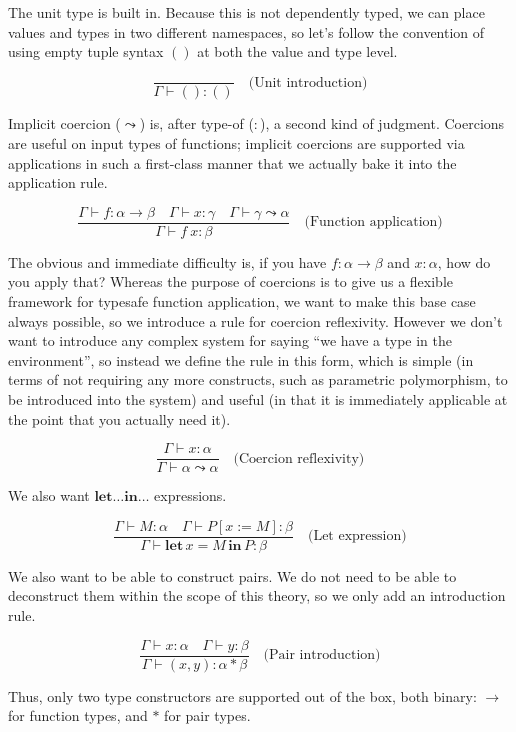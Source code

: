 \documentclass{article}
\begin{document}
The unit type is built in. Because this is not dependently typed, we can place
values and types in two different namespaces, so let's follow the convention of
using empty tuple syntax $()$ at both the value and type level.

\[ \frac{}{\Gamma\vdash()\mathbin{:}()}\quad\text{(Unit introduction)} \]

Implicit coercion ($\leadsto$) is, after type-of ($:$), a second kind of
judgment. Coercions are useful on input types of functions; implicit coercions
are supported via applications in such a first-class manner that we actually
bake it into the application rule.

\[ \frac{\Gamma\vdash f\mathbin{:}\alpha\to\beta\quad\Gamma\vdash x\mathbin{:}\gamma\quad\Gamma\vdash \gamma\leadsto\alpha}{\Gamma\vdash f~x\mathbin{:}\beta}\quad\text{(Function application)} \]

The obvious and immediate difficulty is, if you have
$f\mathbin{:}\alpha\to\beta$ and $x\mathbin{:}\alpha$, how do you apply that?
Whereas the purpose of coercions is to give us a flexible framework for typesafe
function application, we want to make this base case always possible, so we
introduce a rule for coercion reflexivity. However we don't want to introduce
any complex system for saying ``we have a type in the environment'', so instead
we define the rule in this form, which is simple (in terms of not requiring any
more constructs, such as parametric polymorphism, to be introduced into the
system) and useful (in that it is immediately applicable at the point that you
actually need it).

\[ \frac{\Gamma\vdash x\mathbin{:}\alpha}{\Gamma\vdash \alpha\leadsto\alpha}\quad\text{(Coercion reflexivity)} \]

We also want $\textbf{let}\dots\textbf{in}\dots$ expressions.

\[ \frac{\Gamma\vdash M\mathbin{:}\alpha\quad\Gamma\vdash P[x:=M]\mathbin{:}\beta}{\Gamma\vdash \textbf{let}\, x = M \,\textbf{in}\, P\mathbin{:}\beta}\quad\text{(Let expression)} \]

We also want to be able to construct pairs. We do not need to be able to
deconstruct them within the scope of this theory, so we only add an introduction
rule.

\[ \frac{\Gamma\vdash x\mathbin{:}\alpha\quad\Gamma\vdash y\mathbin{:}\beta}{\Gamma\vdash (x, y)\mathbin{:}\alpha*\beta}\quad\text{(Pair introduction)} \]

Thus, only two type constructors are supported out of the box, both binary:
$\to$ for function types, and $*$ for pair types.
\end{document}

